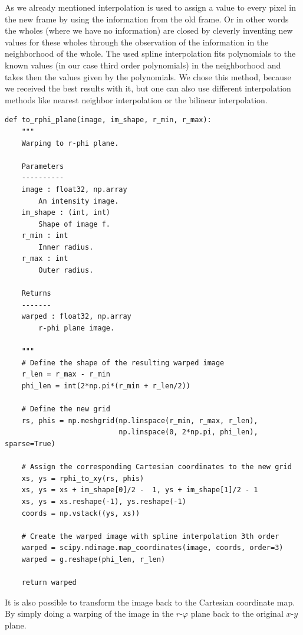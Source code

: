 As we already mentioned interpolation is used to assign a value to every pixel in the new frame by using the information from the old frame. Or in other words the wholes (where we have no information) are closed by cleverly inventing new values for these wholes through the observation of the information in the neighborhood of the whole. The used spline interpolation fits polynomials to the known values (in our case third order polynomials) in the neighborhood and takes then the values given by the polynomials. We chose this method, because we received the best results with it, but one can also use different interpolation methods like nearest neighbor interpolation or the bilinear interpolation. 
\lstset{language=Python, numbers = none}
\begin{lstlisting}[frame=lines]
def to_rphi_plane(image, im_shape, r_min, r_max):
    """
    Warping to r-phi plane.

    Parameters
    ----------
    image : float32, np.array 
        An intensity image.
    im_shape : (int, int)
        Shape of image f.
    r_min : int
        Inner radius.
    r_max : int
        Outer radius.

    Returns
    -------
    warped : float32, np.array 
        r-phi plane image. 

    """
    # Define the shape of the resulting warped image
    r_len = r_max - r_min
    phi_len = int(2*np.pi*(r_min + r_len/2))
    
	# Define the new grid    
    rs, phis = np.meshgrid(np.linspace(r_min, r_max, r_len), 
                           np.linspace(0, 2*np.pi, phi_len), sparse=True)
    
    # Assign the corresponding Cartesian coordinates to the new grid
    xs, ys = rphi_to_xy(rs, phis)
    xs, ys = xs + im_shape[0]/2 -  1, ys + im_shape[1]/2 - 1
    xs, ys = xs.reshape(-1), ys.reshape(-1)
    coords = np.vstack((ys, xs))
    
    # Create the warped image with spline interpolation 3th order
    warped = scipy.ndimage.map_coordinates(image, coords, order=3)
    warped = g.reshape(phi_len, r_len)
    
    return warped
\end{lstlisting}
It is also possible to transform the image back to the Cartesian coordinate map. By simply doing a warping of the image in the $r$-$\varphi$ plane back to the original $x$-$y$ plane.\\
